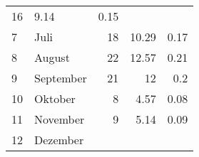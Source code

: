 \begin{longtable}{lXrrr}
       \num{16} &
       \num[round-mode=places,round-precision=2]{9,14} &
         \num[round-mode=places,round-precision=2]{0,15} \\

     7 &
     \multicolumn{1}{X}{ Juli   } &


       \num{18} &
       \num[round-mode=places,round-precision=2]{10,29} &
         \num[round-mode=places,round-precision=2]{0,17} \\

     8 &
     \multicolumn{1}{X}{ August   } &


       \num{22} &
       \num[round-mode=places,round-precision=2]{12,57} &
         \num[round-mode=places,round-precision=2]{0,21} \\

     9 &
     \multicolumn{1}{X}{ September   } &


       \num{21} &
       \num[round-mode=places,round-precision=2]{12} &
         \num[round-mode=places,round-precision=2]{0,2} \\

     10 &
     \multicolumn{1}{X}{ Oktober   } &


       \num{8} &
       \num[round-mode=places,round-precision=2]{4,57} &
         \num[round-mode=places,round-precision=2]{0,08} \\

     11 &
     \multicolumn{1}{X}{ November   } &


       \num{9} &
       \num[round-mode=places,round-precision=2]{5,14} &
         \num[round-mode=places,round-precision=2]{0,09} \\

     12 &
     \multicolumn{1}{X}{ Dezember   } &



\end{longtable}
